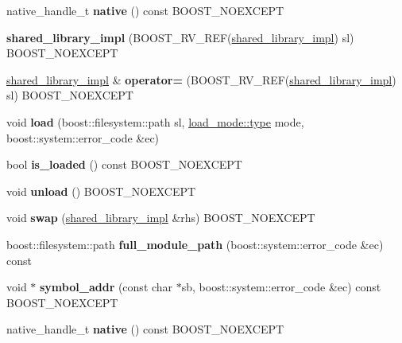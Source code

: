 \begin{DoxyCompactItemize}
\item 
\mbox{\label{a01624_a0517caf0566e0bbc2573a9e9f427fa92}} 
native\+\_\+handle\+\_\+t {\bfseries native} () const B\+O\+O\+S\+T\+\_\+\+N\+O\+E\+X\+C\+E\+PT
\item 
\mbox{\label{a01624_a45d5bb26fa73a9639618bab3e343f114}} 
{\bfseries shared\+\_\+library\+\_\+impl} (B\+O\+O\+S\+T\+\_\+\+R\+V\+\_\+\+R\+EF(\hyperlink{a01624}{shared\+\_\+library\+\_\+impl}) sl) B\+O\+O\+S\+T\+\_\+\+N\+O\+E\+X\+C\+E\+PT
\item 
\mbox{\label{a01624_a4516d0b76678a60333cb5ccbf7cc52c2}} 
\hyperlink{a01624}{shared\+\_\+library\+\_\+impl} \& {\bfseries operator=} (B\+O\+O\+S\+T\+\_\+\+R\+V\+\_\+\+R\+EF(\hyperlink{a01624}{shared\+\_\+library\+\_\+impl}) sl) B\+O\+O\+S\+T\+\_\+\+N\+O\+E\+X\+C\+E\+PT
\item 
\mbox{\label{a01624_a2c3bbcf10638f5fdeb13b1f194431ac5}} 
void {\bfseries load} (boost\+::filesystem\+::path sl, \hyperlink{a00272_a1918a602801479bc0bade54ff5665129}{load\+\_\+mode\+::type} mode, boost\+::system\+::error\+\_\+code \&ec)
\item 
\mbox{\label{a01624_a3729718e9c72b30a85087a89b642becb}} 
bool {\bfseries is\+\_\+loaded} () const B\+O\+O\+S\+T\+\_\+\+N\+O\+E\+X\+C\+E\+PT
\item 
\mbox{\label{a01624_a78b3736f4aab0a61fd07a45eb5a54c52}} 
void {\bfseries unload} () B\+O\+O\+S\+T\+\_\+\+N\+O\+E\+X\+C\+E\+PT
\item 
\mbox{\label{a01624_a7d87e32878fd68cd3c59531c5b6dcaf1}} 
void {\bfseries swap} (\hyperlink{a01624}{shared\+\_\+library\+\_\+impl} \&rhs) B\+O\+O\+S\+T\+\_\+\+N\+O\+E\+X\+C\+E\+PT
\item 
\mbox{\label{a01624_afefd81d306682e1e540bdaddbd58c8b3}} 
boost\+::filesystem\+::path {\bfseries full\+\_\+module\+\_\+path} (boost\+::system\+::error\+\_\+code \&ec) const
\item 
\mbox{\label{a01624_a79bc56fc8e9c4fb98993893b491986a8}} 
void $\ast$ {\bfseries symbol\+\_\+addr} (const char $\ast$sb, boost\+::system\+::error\+\_\+code \&ec) const B\+O\+O\+S\+T\+\_\+\+N\+O\+E\+X\+C\+E\+PT
\item 
\mbox{\label{a01624_a0517caf0566e0bbc2573a9e9f427fa92}} 
native\+\_\+handle\+\_\+t {\bfseries native} () const B\+O\+O\+S\+T\+\_\+\+N\+O\+E\+X\+C\+E\+PT
\end{DoxyCompactItemize}
